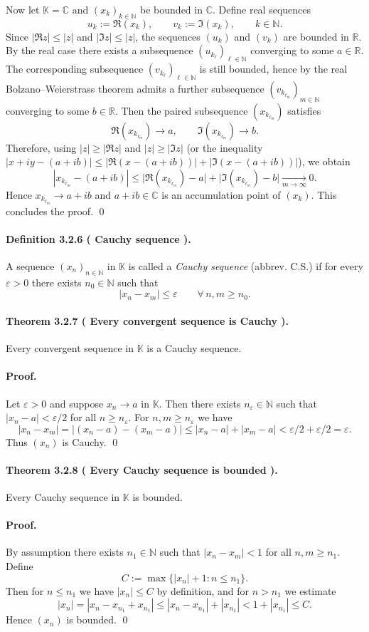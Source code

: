 \documentclass[12pt,a4paper]{article}
\newcommand{\N}{\mathbb{N}}
\newcommand{\R}{\mathbb{R}}
\newcommand{\C}{\mathbb{C}}
\newcommand{\K}{\mathbb{K}} %
\newcommand{\eps}{\varepsilon}
\newcommand{\NumberedDefinition}[3]{%
\paragraph*{Definition #1 ( #2 ).} #3\par}
\newcommand{\NumberedTheorem}[3]{%
\paragraph*{Theorem #1 ( #2 ).} #3\par}
\theoremstyle{plain}
\theoremstyle{definition}
\theoremstyle{remark}
\begin{document}
Now let $\K=\C$ and $(x_k)_{k\in\N}$ be bounded in $\C$. Define real sequences
\[
	u_k := \Re(x_k), \qquad v_k := \Im(x_k), \qquad k\in\N.
\]
Since $|\Re z|\le |z|$ and $|\Im z|\le |z|$, the sequences $(u_k)$ and $(v_k)$ are bounded in $\R$. By the real case there exists a subsequence $(u_{k_\ell})_{\ell\in\N}$ converging to some $a\in\R$. The corresponding subsequence $(v_{k_\ell})_{\ell\in\N}$ is still bounded, hence by the real Bolzano--Weierstrass theorem admits a further subsequence $(v_{k_{\ell_m}})_{m\in\N}$ converging to some $b\in\R$. Then the paired subsequence $(x_{k_{\ell_m}})$ satisfies
\[
	\Re(x_{k_{\ell_m}}) \to a, \qquad \Im(x_{k_{\ell_m}}) \to b.
\]
Therefore, using $|z|\ge |\Re z|$ and $|z|\ge |\Im z|$ (or the inequality $|x+iy-(a+ib)|\le |\Re(x-(a+ib))| + |\Im(x-(a+ib))|$), we obtain
\[
	|x_{k_{\ell_m}} - (a+ib)| \le \big|\Re(x_{k_{\ell_m}}) - a\big| + \big|\Im(x_{k_{\ell_m}}) - b\big| \xrightarrow[m\to\infty]{} 0.
\]
Hence $x_{k_{\ell_m}}\to a+ib$ and $a+ib\in\C$ is an accumulation point of $(x_k)$. This concludes the proof. \qed

\NumberedDefinition{3.2.6}{Cauchy sequence}{A sequence $(x_n)_{n\in\N}$ in $\K$ is called a \emph{Cauchy sequence} (abbrev. C.S.) if for every $\eps>0$ there exists $n_0\in\N$ such that
\[
	|x_n - x_m| \le \eps \qquad \forall\, n,m\ge n_0.
\]}

\NumberedTheorem{3.2.7}{Every convergent sequence is Cauchy}{Every convergent sequence in $\K$ is a Cauchy sequence.}

\paragraph{Proof.} Let $\eps>0$ and suppose $x_n\to a$ in $\K$. Then there exists $n_\eps\in\N$ such that $|x_n-a|<\eps/2$ for all $n\ge n_\eps$. For $n,m\ge n_\eps$ we have
\[
	|x_n-x_m| = |(x_n-a)-(x_m-a)| \le |x_n-a| + |x_m-a| < \eps/2+\eps/2 = \eps.
\]
Thus $(x_n)$ is Cauchy. \qed

\NumberedTheorem{3.2.8}{Every Cauchy sequence is bounded}{Every Cauchy sequence in $\K$ is bounded.}

\paragraph{Proof.} By assumption there exists $n_1\in\N$ such that $|x_n-x_m|<1$ for all $n,m\ge n_1$. Define
\[
	C := \max\{ |x_n|+1 : n\le n_1\}.
\]
Then for $n\le n_1$ we have $|x_n|\le C$ by definition, and for $n>n_1$ we estimate
\[
	|x_n| = |x_n-x_{n_1}+x_{n_1}| \le |x_n-x_{n_1}| + |x_{n_1}| < 1 + |x_{n_1}| \le C.
\]
Hence $(x_n)$ is bounded. \qed
\end{document}
